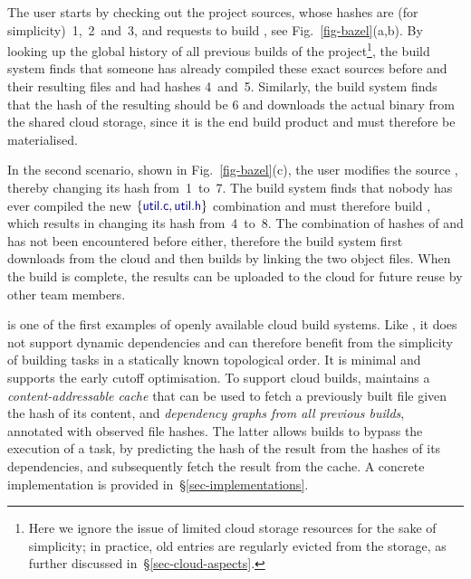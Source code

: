 The user starts by checking out the project sources, whose hashes are (for
simplicity)~1,~2~and~3, and requests to build , see
Fig.~\ref{fig-bazel}(a,b). By looking up the global history of all previous
builds of the project\footnote{Here we ignore the issue of limited cloud storage
resources for the sake of simplicity; in practice, old entries are regularly
evicted from the storage, as further discussed in~\S\ref{sec-cloud-aspects}.},
the build system finds that someone has already compiled these exact sources
before and their resulting files  and  had hashes 4~and~5.
Similarly, the build system finds that the hash of the resulting 
should be 6 and downloads the actual binary from the shared cloud storage, since
it is the end build product and must therefore be materialised.

In the second scenario, shown in Fig.~\ref{fig-bazel}(c), the user modifies the
source , thereby changing its hash from~1~to~7. The build system
finds that nobody has ever compiled the new $\{\cmd{util.c}, \cmd{util.h}\}$
combination and must therefore build , which results in changing its
hash from~4~to~8. The combination of hashes of  and
 has not been encountered before either, therefore the build system
first downloads  from the cloud and then builds  by
linking the two object files. When the build is complete, the results
can be uploaded to the cloud for future reuse by other team members.

\Bazel is one of the first examples of openly available cloud build systems.
Like \Make, it does not support dynamic dependencies and can therefore benefit
from the simplicity of building tasks in a statically known topological order.
It is minimal and supports the early cutoff optimisation. To support cloud
builds, \Bazel maintains a \emph{content-addressable cache} that can be used to
fetch a previously built file given the hash of its content, and
\emph{dependency graphs from all previous builds}, annotated with observed file
hashes. The latter allows builds to bypass the execution of a task, by predicting the
hash of the result from the hashes of its dependencies, and subsequently
fetch the result from the cache. A concrete implementation is provided
in~\S\ref{sec-implementations}.

